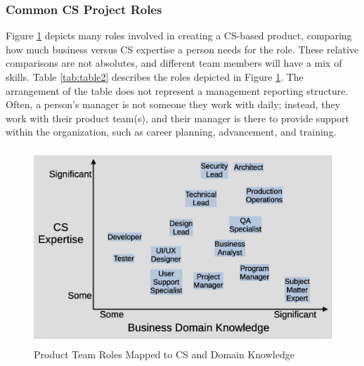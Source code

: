 \subsubsection{Common CS Project Roles}
Figure \ref{fig:figure2} depicts many roles involved in creating a CS-based product, comparing how much business versus CS expertise a person needs for the role. These relative comparisons are not absolutes, and different team members will have a mix of skills. Table \ref{tab:table2} describes the roles depicted in Figure \ref{fig:figure2}. The arrangement of the table does not represent a management reporting structure. Often, a person's manager is not someone they work with daily; instead, they work with their product team(s), and their manager is there to provide support within the organization, such as career planning, advancement, and training. 

\begin{figure}[H]
	\begin{center}
		\caption{Product Team Roles Mapped to CS and Domain Knowledge}
		\label{fig:figure2}
		\vskip 4pt
		\includegraphics[height=2.9in]{figs2/cs-team-roles-knowledge-area.eps}
	\end{center}
\end{figure}



